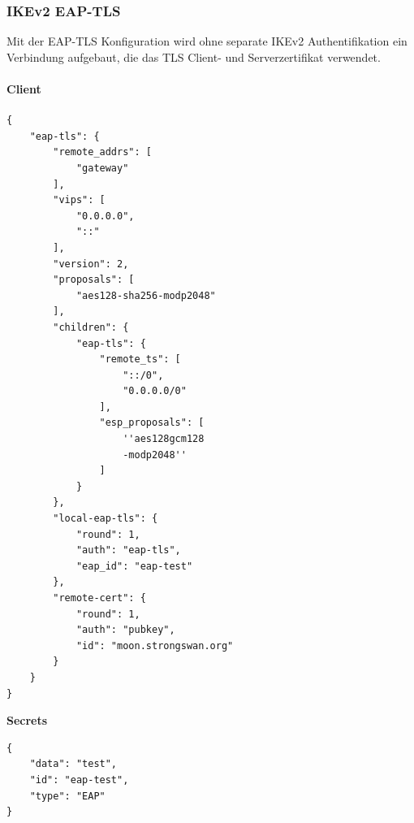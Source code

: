 \subsubsection{IKEv2 EAP-TLS}
Mit der EAP-TLS Konfiguration wird ohne separate IKEv2 Authentifikation ein Verbindung aufgebaut, die das TLS Client- und Serverzertifikat verwendet.\\
\noindent\begin{minipage}[t]{0.5\textwidth}
\vspace{0pt}
\paragraph{Client}\mbox{}\medskip
\begin{lstlisting}[style=BashInputStyle]
{
    "eap-tls": {
        "remote_addrs": [
            "gateway"
        ],
        "vips": [
            "0.0.0.0",
            "::"
        ],
        "version": 2,
        "proposals": [
            "aes128-sha256-modp2048"
        ],
        "children": {
            "eap-tls": {
                "remote_ts": [
                    "::/0",
                    "0.0.0.0/0"
                ],
                "esp_proposals": [
                    ''aes128gcm128
                    -modp2048''
                ]
            }
        },
        "local-eap-tls": {
            "round": 1,
            "auth": "eap-tls",
            "eap_id": "eap-test"
        },
        "remote-cert": {
            "round": 1,
            "auth": "pubkey",
            "id": "moon.strongswan.org"
        }
    }
}
\end{lstlisting}
\hspace*{18pt}\textbf{Secrets}\mbox{}\medskip
\begin{lstlisting}[style=BashInputStyle]
{
    "data": "test",
    "id": "eap-test",
    "type": "EAP"
}
\end{lstlisting}
\end{minipage}
\hfill
